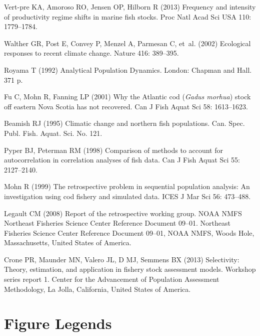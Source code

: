 \documentclass[10pt]{article}
\begin{document}
\begin{thebibliography}{10}
Vert-pre KA, Amoroso RO, Jensen OP, Hilborn R (2013) Frequency and intensity of
  productivity regime shifts in marine fish stocks.
\newblock Proc Natl Acad Sci USA 110: 1779--1784.

Walther GR, Post E, Convey P, Menzel A, Parmesan C, et~al. (2002) Ecological
  responses to recent climate change.
\newblock Nature 416: 389--395.

Royama T (1992) Analytical Population Dynamics.
\newblock London: Chapman and Hall. 371 p.

Fu C, Mohn R, Fanning LP (2001) Why the {Atlantic cod} (\textit{Gadus morhua})
  stock off eastern {Nova Scotia} has not recovered.
\newblock Can J Fish Aquat Sci 58: 1613--1623.

Beamish RJ (1995) Climatic change and northern fish populations.
\newblock Can. Spec. Publ. Fish. Aquat. Sci. No. 121.

Pyper BJ, Peterman RM (1998) Comparison of methods to account for
  autocorrelation in correlation analyses of fish data.
\newblock Can J Fish Aquat Sci 55: 2127--2140.

Mohn R (1999) The retrospective problem in sequential population analysis: An
  investigation using cod fishery and simulated data.
\newblock ICES J Mar Sci 56: 473--488.

Legault CM (2008) Report of the retrospective working group. {NOAA NMFS
  Northeast Fisheries Science Center Reference Document} 09--01.
\newblock Northeast Fisheries Science Center Reference Document 09--01, NOAA
  NMFS, Woods Hole, Massachusetts, United States of America.

Crone PR, Maunder MN, Valero JL, D MJ, Semmens BX (2013) Selectivity: Theory,
  estimation, and application in fishery stock assessment models.
\newblock
Workshop series report 1.
\newblock
Center for the Advancement of Population
Assessment Methodology, La Jolla, California, United States of America.

\end{thebibliography}


\clearpage

\section*{Figure Legends}
\end{document}
